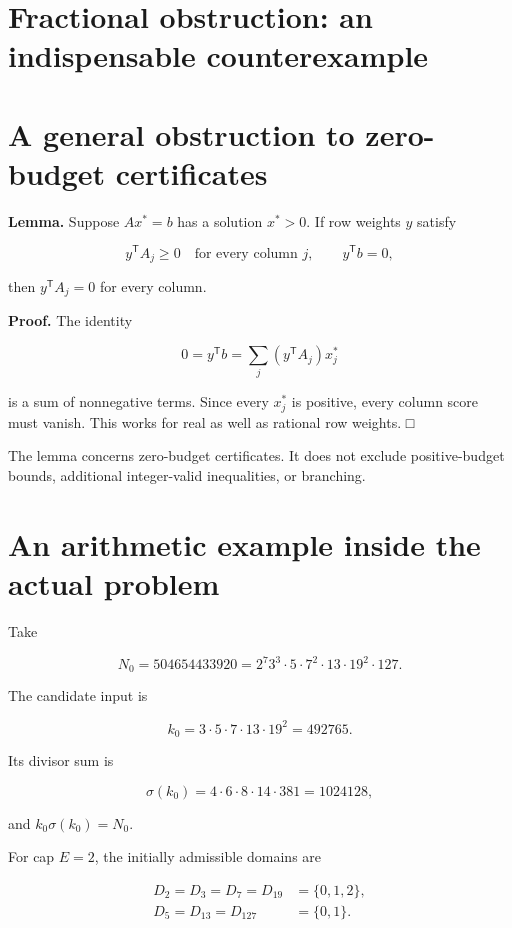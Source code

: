 \section*{Fractional obstruction: an indispensable counterexample}
\section{A general obstruction to zero-budget certificates}\label{fractional:a-general-obstruction-to-zero-budget-certificates}

\textbf{Lemma.} Suppose \(Ax^*=b\) has a solution \(x^*>0\). If row weights \(y\) satisfy

\[
y^{\mathsf T}A_j\ge0\quad\text{for every column }j,
\qquad y^{\mathsf T}b=0,
\]

then \(y^{\mathsf T}A_j=0\) for every column.

\textbf{Proof.} The identity

\[
0=y^{\mathsf T}b=\sum_j(y^{\mathsf T}A_j)x_j^*
\]

is a sum of nonnegative terms. Since every \(x_j^*\) is positive, every column score must vanish. This works for real as well as rational row weights. □

The lemma concerns zero-budget certificates. It does not exclude positive-budget bounds, additional integer-valid inequalities, or branching.

\section{An arithmetic example inside the actual problem}\label{fractional:an-arithmetic-example-inside-the-actual-problem}

Take

\[
N_0=504654433920=2^7 3^3\cdot5\cdot7^2\cdot13\cdot19^2\cdot127.
\]

The candidate input is

\[
k_0=3\cdot5\cdot7\cdot13\cdot19^2=492765.
\]

Its divisor sum is

\[
\sigma(k_0)=4\cdot6\cdot8\cdot14\cdot381=1024128,
\]

and \(k_0\sigma(k_0)=N_0\).

For cap \(E=2\), the initially admissible domains are

\[
\begin{aligned}
D_2=D_3=D_7=D_{19}&=\{0,1,2\},\\
D_5=D_{13}=D_{127}&=\{0,1\}.
\end{aligned}
\]

